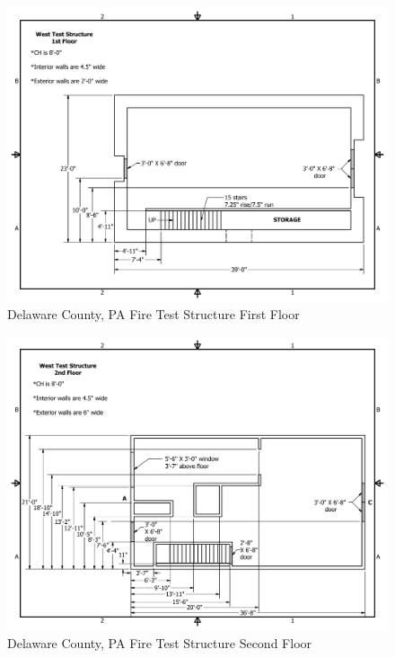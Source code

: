 \documentclass{article}
\begin{document}
\begin{figure}[!ht]
	\centering
	\includegraphics[width=4.5in]{Figures/Air_Entrainment/West_Test_Structure_1st_Floor_original.pdf}
	\caption{Delaware County, PA Fire Test Structure First Floor}
	\label{fig:Delaware_County,_PA_Fire_Test_Structure_First_Floor}
\end{figure}

\begin{figure}[!ht]
	\centering
	\includegraphics[width=4.5in]{Figures/Air_Entrainment/West_Test_Structure_2nd_Floor.pdf}
	\caption{Delaware County, PA Fire Test Structure Second Floor}
	\label{fig:Delaware_County,_PA_Fire_Test_Structure_Second_Floor}
\end{figure}

\clearpage
\end{document}

